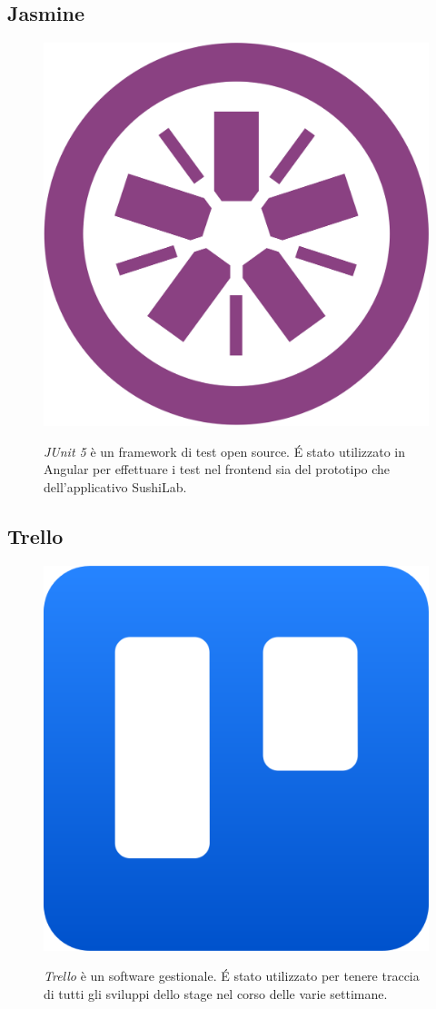 \subsection*{Jasmine}
\FloatBarrier
\begin{figure}[!h]
  \begin{minipage}[h]{0.3\linewidth}
    \centering
    \includegraphics[width=0.4\linewidth]{immagini/jasmine.png}
  \end{minipage}
  \begin{minipage}[!h]{0.7\linewidth}
    \textit{JUnit 5} è un framework di test open source. É stato utilizzato in Angular per effettuare i test nel frontend sia del prototipo che dell'applicativo SushiLab.
  \end{minipage}
\end{figure}
\FloatBarrier
\subsection*{Trello}
\FloatBarrier
\begin{figure}[!h]
  \begin{minipage}[h]{0.3\linewidth}
    \centering
    \includegraphics[width=0.35\linewidth]{immagini/trello.png}
  \end{minipage}
  \begin{minipage}[!h]{0.7\linewidth}
    \textit{Trello} è un software gestionale. É stato utilizzato per tenere traccia di tutti gli sviluppi dello stage nel corso delle varie settimane.
  \end{minipage}
\end{figure}
\FloatBarrier
